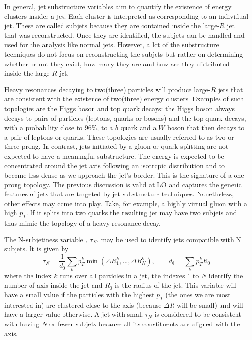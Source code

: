 In general, jet substructure variables aim to quantify the existence of energy clusters  insider a jet. Each cluster is interpreted as corresponding to an individual jet. These are called subjets because they are contained inside the large-$R$ jet that was reconstructed. Once they are identified, the subjets can be handled and used for the analysis like normal jets. However, a lot of the substructure techniques do not focus on reconstructing the subjets but rather on determining whether or not they exist, how many they are and how are they distributed inside the large-$R$ jet. 

Heavy resonances decaying to two(three) particles will produce large-$R$ jets that are consistent with the existence of two(three) energy clusters. Examples of such topologies are the Higgs boson and top quark decays: the Higgs boson always decays to pairs of particles (leptons, quarks or bosons) and the top quark decays, with a probability close to $96\%$, to a $b$ quark and a $W$ boson that then decays to a pair of leptons or quarks. These topologies are usually referred to as two or three prong. In contrast, jets initiated by a gluon or quark splitting are not expected to have a meaningful substructure. The energy is expected to be concentrated around the jet axis following an isotropic distribution and to become less dense as we approach the jet's border. This is the signature of a one-prong topology. The previous discussion is valid at LO and captures the generic features of jets that are targeted by jet substructure techniques. Nonetheless, other effects may come into play. Take, for example, a highly virtual gluon with a high $p_T$. If it splits into two quarks the resulting jet may have two subjets and thus mimic the topology of a heavy resonance decay.

The N-subjetiness variable \cite{Nsubjetiness}, $\tau_N$, may be used to identify jets compatible with N subjets. It is given by 
\begin{equation}
	\tau_N = \frac{1}{d_0}\sum_{k}p_T^k \min(\Delta R_1^k,...,\Delta R_N^k), \qquad d_0=\sum_{k}p_T^k R_0
\end{equation}
where the index $k$ runs over all particles in a jet, the indexes $1$ to $N$ identify the number of axis inside the jet and $R_0$ is the radius of the jet. This variable will have a small value if the particles with the highest $p_T$ (the ones we are most interested in) are clustered close to the axis (because $\Delta R$ will be small) and will have a larger value otherwise. A jet with small $\tau_N$ is considered to be consistent with having $N$ or fewer subjets because all its constituents are aligned with the axis.

